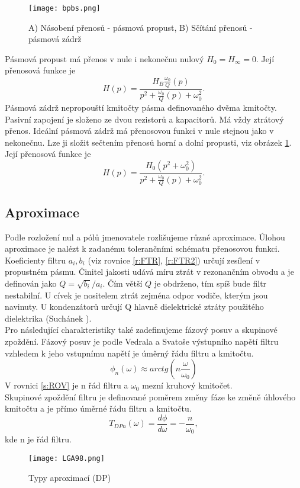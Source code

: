 \begin{figure}[h]
\centering
\texttt{[image: bpbs.png]}
\caption[A) Násobení přenosů - pásmová propust, B) Sčítání přenosů - pásmová zádrž]{A) Násobení přenosů - pásmová propust, B) Sčítání přenosů - pásmová zádrž \cite{10} \label{s:BPBS}}
\end{figure}
\noindent Pásmová propust má přenos v nule i nekonečnu nulový $H_{0} = H_{\infty} = 0$. Její přenosová funkce je~\cite{9}
\begin{equation}
H(p) = \frac{H_{B} \frac{\omega _0}{Q} (p) }{p^2 + \frac{\omega _0}{Q}(p) + \omega _0 ^2}.
\end{equation}
Pásmová zádrž nepropouští kmitočty pásma definovaného dvěma kmitočty. Pasivní zapojení je složeno ze dvou rezistorů a kapacitorů. Má vždy ztrátový přenos. Ideální pásmová zádrž má přenosovou funkci v nule stejnou jako v nekonečnu. Lze ji složit sečtením přenosů horní a dolní propusti, viz obrázek \ref{s:BPBS}. Její přenosová funkce je~\cite{9}
\begin{equation}
H(p) = \frac{H_{0} (p^2 + \omega_0^2)}{p^2 + \frac{\omega _0}{Q}(p) + \omega _0 ^2}.
\end{equation}
\subsection{Aproximace}
Podle rozložení nul a pólů jmenovatele rozlišujeme různé aproximace. Úlohou aproximace je nalézt k zadanému tolerančními schématu přenosovou funkci. Koeficienty filtru $a_i, b_i$ (viz rovnice \ref{r:FTR}, \ref{r:FTR2}) určují zesílení v propustném pásmu. Činitel jakosti udává míru ztrát v rezonančním obvodu a je definován jako $Q = \sqrt{b_i}/a_i$. Čím větší $Q$ je obdrženo, tím spíš bude filtr nestabilní. U cívek je nositelem ztrát zejména odpor vodiče, kterým jsou navinuty. U kondenzátorů určují Q hlavně dielektrické ztráty použitého dielektrika (Suchánek \cite{6}).\\
Pro následující charakteristiky také zadefinujeme fázový posuv a skupinové zpoždění. Fázový posuv je podle Vedrala a Svatoše \cite{8} výstupního napětí filtru vzhledem k jeho vstupnímu napětí je úměrný řádu filtru a kmitočtu.
\begin{equation}
\phi _n(\omega) \approx arctg(n \frac{\omega}{\omega _0}) \label{s:ROV}
\end{equation}
V rovnici \ref{s:ROV} je n řád filtru a $\omega _0$ mezní kruhový kmitočet.\\
Skupinové zpoždění filtru je definované poměrem změny fáze ke změně úhlového kmitočtu a je přímo úměrné řádu filtru a kmitočtu.\\
\begin{equation}
T _{DPn}(\omega) = \frac{d\phi}{d\omega} = - \frac{n}{\omega _0},
\end{equation}
\noindent kde n je řád filtru.\\
\begin{figure}[h]
\centering
\texttt{[image: LGA98.png]}
\caption[Typy aproximací (DP)]{Typy aproximací (DP)\cite{11}}
\end{figure}
